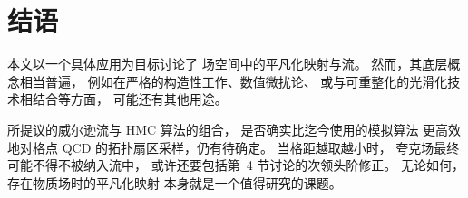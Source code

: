 \section{结语}

本文以一个具体应用为目标讨论了
场空间中的平凡化映射与流。
然而，其底层概念相当普遍，
例如在严格的构造性工作、数值微扰论、
或与可重整化的光滑化技术相结合等方面，
可能还有其他用途。

所提议的威尔逊流与 HMC 算法的组合，
是否确实比迄今使用的模拟算法
更高效地对格点 QCD 的拓扑扇区采样，仍有待确定。
当格距越取越小时，
夸克场最终可能不得不被纳入流中，
或许还要包括第~4 节讨论的次领头阶修正。
无论如何，存在物质场时的平凡化映射
本身就是一个值得研究的课题。
